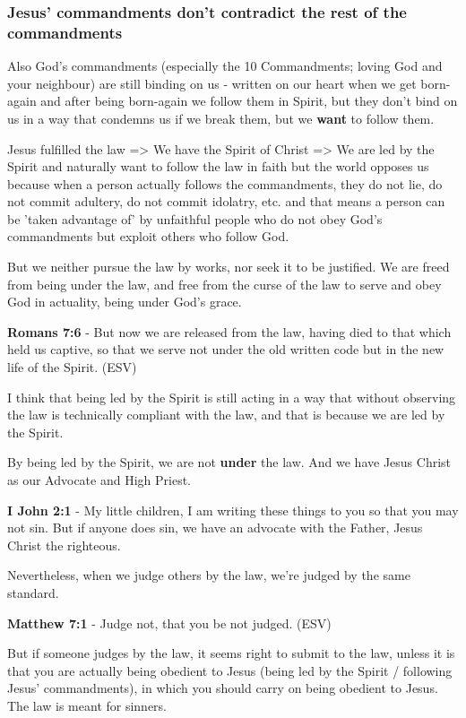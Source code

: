 \documentclass[11pt]{article}
\begin{document}
\subsubsection{Jesus' commandments don't contradict the rest of the commandments}
\label{sec:org15a0692}
Also God's commandments (especially the 10 Commandments; loving God and your neighbour) are still binding on us - written on our heart when we get born-again and after being born-again we follow them in Spirit, but they don't bind on us in a way that condemns us if we  break them, but we \textbf{want} to follow them.

Jesus fulfilled the law => We have the Spirit of Christ => We are led by the Spirit and naturally want to follow the law in faith but the world opposes us because when a person actually follows the commandments, they do not lie, do not commit adultery, do not commit idolatry, etc. and that means a person can be 'taken advantage of' by unfaithful people who do not obey God's commandments but exploit others who follow God.

But we neither pursue the law by works, nor seek it to be justified.
We are freed from being under the law, and free from the curse of the law to serve and obey God in actuality, being under God's grace.

\textbf{Romans 7:6} - But now we are released from the law, having died to that which held us captive, so that we serve not under the old written code but in the new life of the Spirit. (ESV)

I think that being led by the Spirit is still acting in a way that without observing the law is technically compliant with the law, and that is because we are led by the Spirit.

By being led by the Spirit, we are not \textbf{under} the law. And we have Jesus Christ as our Advocate and High Priest.

\textbf{I John 2:1} - My little children, I am writing these things to you so that you may not sin. But if anyone does sin, we have an advocate with the Father, Jesus Christ the righteous.

Nevertheless, when we judge others by the law, we're judged by the same standard.

\textbf{Matthew 7:1} - Judge not, that you be not judged. (ESV)

But if someone judges by the law, it seems right to submit to the law, unless it is that you are actually being obedient to Jesus (being led by the Spirit / following Jesus' commandments), in which you should carry on being obedient to Jesus. The law is meant for sinners.
\end{document}
